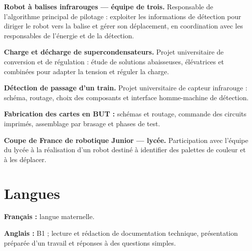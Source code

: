 \documentclass[10pt,a4paper]{article}
\begin{document}
\vspace{0.2cm}

\textbf{Robot à balises infrarouges --- équipe de trois.}
Responsable de l'algorithme principal de pilotage :
exploiter les informations de détection pour diriger le robot
vers la balise et gérer son déplacement, en coordination
avec les responsables de l'énergie et de la détection.\par

\vspace{0.2cm}

\textbf{Charge et décharge de supercondensateurs.}
Projet universitaire de conversion et de régulation :
étude de solutions abaisseuses, élévatrices et combinées
pour adapter la tension et réguler la charge.\par

\vspace{0.2cm}

\textbf{Détection de passage d'un train.}
Projet universitaire de capteur infrarouge : schéma,
routage, choix des composants et interface homme-machine
de détection.\par

\vspace{0.2cm}

\textbf{Fabrication des cartes en BUT :}
schémas et routage, commande des circuits imprimés,
assemblage par brasage et phases de test.\par

\vspace{0.2cm}

\textbf{Coupe de France de robotique Junior --- lycée.}
Participation avec l'équipe du lycée à la réalisation
d'un robot destiné à identifier des palettes de couleur
et à les déplacer.

\newpage


\section{Langues}

\vspace{0.2cm}

\textbf{Français :} langue maternelle.

\vspace{0.2cm}

\textbf{Anglais :} B1 ; lecture et rédaction de documentation
technique, présentation préparée d'un travail et réponses
à des questions simples.
\end{document}
